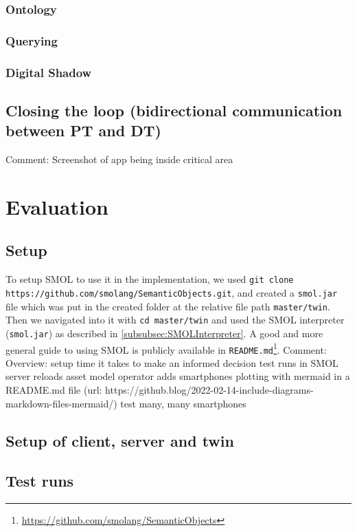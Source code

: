 \documentclass{article}
\begin{document}
\subsubsection{Ontology}
\subsubsection{Querying}
\subsubsection{Digital Shadow}



\subsection{Closing the loop (bidirectional communication between PT and DT)}
Comment: Screenshot of app being inside critical area




\newpage
\section{Evaluation}\label{sec:Evaluation}
\subsection{Setup}\label{Setup}
To setup SMOL to use it in the implementation, we used 
\verb|git clone https://github.com/smolang/SemanticObjects.git|, and created a \verb|smol.jar| file which was put in the created folder at the relative file path \verb|master/twin|. Then we navigated into it with \verb|cd master/twin| and used the SMOL interpreter (\verb|smol.jar|) as described in \ref{subsubsec:SMOLInterpreter}. A good and more general guide to using SMOL is publicly available in \verb|README.md|\footnote{\url{https://github.com/smolang/SemanticObjects}}.
Comment: Overview:
setup
time it takes to make an informed decision
test runs in SMOL
   server reloads asset model
   operator adds smartphones
plotting with mermaid in a README.md file (url: https://github.blog/2022-02-14-include-diagrams-markdown-files-mermaid/)
test many, many smartphones


\subsection{Setup of client, server and twin}
\subsection{Test runs}
\end{document}
